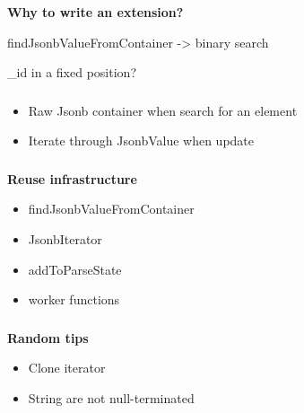 \documentclass[usenames,dvipsnames, 18pt, compress, aspectratio=169]{beamer}
\begin{document}
\begin{frame}
    \frametitle{}
    \begin{center}
        \textbf{Why to write an extension?}

        \vspace{1cm}
        \begin{flushleft}
            findJsonbValueFromContainer -> binary search

            \_id in a fixed position?
        \end{flushleft}

    \end{center}
\end{frame}

\begin{frame}
    \frametitle{}
    \begin{center}

        \begin{itemize}[label={\MVRightarrow}]
            \item Raw Jsonb container when search for an element
            \item Iterate through JsonbValue when update
        \end{itemize}

    \end{center}
\end{frame}

\begin{frame}
    \frametitle{}
    \begin{center}
        \textbf{Reuse infrastructure}

        \begin{itemize}[label={\MVRightarrow}]
            \item findJsonbValueFromContainer
            \item JsonbIterator
            \item addToParseState
            \item worker functions
        \end{itemize}

    \end{center}
\end{frame}

\begin{frame}
    \frametitle{}
    \begin{center}
        \textbf{Random tips}

        \begin{itemize}[label={\MVRightarrow}]
            \item Clone iterator
            \item String are not null-terminated
        \end{itemize}

    \end{center}
\end{frame}
\end{document}
